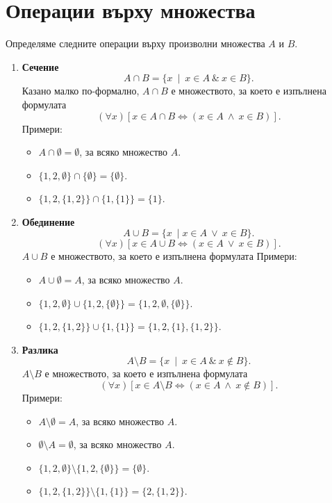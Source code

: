 \section*{Операции върху множества}

Определяме следните операции върху произволни множества $A$ и $B$.
\begin{enumerate}[{\bf (I)}]
\item
  {\bf Сечение}
  \[A\cap B = \{x\ \mid\ x\in A\ \&\ x\in B\}.\]
  Казано малко по-формално, $A\cap B$ е множеството, за което е изпълнена формулата
  \[(\forall x)[x \in A\cap B \iff (x\in A\ \wedge\ x \in B)].\]
  Примери:
  \begin{itemize}
  \item 
    $A \cap \emptyset = \emptyset$, за всяко множество $A$.
  \item
    $\{1,2,\emptyset\} \cap \{\emptyset\} = \{\emptyset\}$.
    \item
      $\{1,2,\{1,2\}\} \cap \{1,\{1\}\} = \{1\}$.
    \end{itemize}
  \item
    {\bf Обединение}
    \[A\cup B = \{x\ \mid x\in A\ \vee\ x\in B\}.\]
    \[(\forall x)[x \in A\cup B \iff (x\in A\ \vee\ x \in B)].\]
    $A\cup B$ е множеството, за което е изпълнена формулата
    Примери:
    \begin{itemize}
    \item 
      $A \cup \emptyset = A$, за всяко множество $A$.
    \item
      $\{1,2,\emptyset\} \cup \{1,2,\{\emptyset\}\} = \{1,2,\emptyset,\{\emptyset\}\}$.
    \item
      $\{1,2,\{1,2\}\} \cup \{1,\{1\}\} = \{1,2,\{1\},\{1,2\}\}$.
    \end{itemize}
  \item
    {\bf Разлика}
    \[A\setminus B = \{x\ \mid\ x\in A\ \&\ x\not\in B\}.\]
    $A\setminus B$ е множеството, за което е изпълнена формулата
    \[(\forall x)[x \in A\setminus B \iff (x\in A\ \wedge\ x \not\in B)].\]
    Примери:
    \begin{itemize}
    \item 
      $A \setminus \emptyset = A$, за всяко множество $A$.
    \item 
      $\emptyset \setminus A = \emptyset$, за всяко множество $A$.
    \item
      $\{1,2,\emptyset\} \setminus \{1,2,\{\emptyset\}\} = \{\emptyset\}$.
    \item
      $\{1,2,\{1,2\}\} \setminus \{1,\{1\}\} = \{2,\{1,2\}\}$.

\end{itemize}
\end{enumerate}
